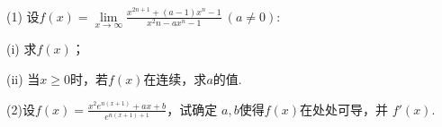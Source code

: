 \documentclass[12pt , a4paper , oneside]{ctexart}
\begin{document}
            \quad
            
            (1) 设$f(x)=\lim\limits_{x \to \infty} \frac{x^{2n+1} + (a-1)x^n - 1}{x^2n -ax^n - 1}~(a\neq 0)$:
            
            \qquad (i) 求$f(x)$；

            \qquad (ii) 当$x \geqslant 0$时，若$f(x)$在连续，求$a$的值.

            (2)设$f(x) = \frac{x^{2} e^{n(x+1)} +ax + b}{e^{n(x+1) + 1}}$，试确定 $a,b$使得$f(x)$在处处可导，并 $f'(x)$.
\end{document}
